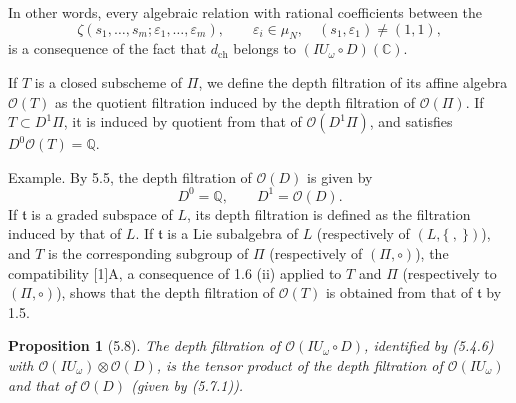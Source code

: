 \documentclass[10pt,a4paper]{article}
\newcommand{\Q}{\mathbb Q}
\newcommand{\OO}{\mathcal O}
\newcommand{\C}{\mathbb C}
\theoremstyle{deligne}
\newtheorem*{proposition*}{Proposition}
\newcommand{\heading}[1]{\vspace{0.65em}\noindent{\bfseries #1}\quad}
\begin{document}
In other words, every algebraic relation with rational coefficients between the
\[
\zeta(s_1,\ldots,s_m;\varepsilon_1,\ldots,\varepsilon_m),\qquad
\varepsilon_i\in\mu_N,\quad (s_1,\varepsilon_1)\ne(1,1),
\]
is a consequence of the fact that \(d_{\mathrm{ch}}\) belongs to \((IU_\omega\circ D)(\C)\).

\heading{5.7.} If \(T\) is a closed subscheme of \(\Pi\), we define the depth filtration of its affine algebra \(\OO(T)\) as the quotient filtration induced by the depth filtration of \(\OO(\Pi)\). If \(T\subset D^1\Pi\), it is induced by quotient from that of \(\OO(D^1\Pi)\), and satisfies \(D^0\OO(T)=\Q\).

Example. By 5.5, the depth filtration of \(\OO(D)\) is given by
\[
\tag{5.7.1}
D^0=\Q,\qquad D^1=\OO(D).
\]
If \(\mathfrak t\) is a graded subspace of \(L\), its depth filtration is defined as the filtration induced by that of \(L\). If \(\mathfrak t\) is a Lie subalgebra of \(L\) (respectively of \((L,\{\ ,\ \})\)), and \(T\) is the corresponding subgroup of \(\Pi\) (respectively of \((\Pi,\circ)\)), the compatibility [1]A, a consequence of 1.6 (ii) applied to \(T\) and \(\Pi\) (respectively to \((\Pi,\circ)\)), shows that the depth filtration of \(\OO(T)\) is obtained from that of \(\mathfrak t\) by 1.5.

\begin{proposition*}[5.8]
The depth filtration of \(\OO(IU_\omega\circ D)\), identified by (5.4.6) with \(\OO(IU_\omega)\otimes\OO(D)\), is the tensor product of the depth filtration of \(\OO(IU_\omega)\) and that of \(\OO(D)\) (given by (5.7.1)).
\end{proposition*}
\end{document}
